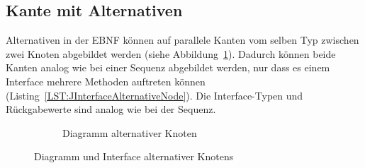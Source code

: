 \documentclass[../InterneDSLs.tex]{subfiles}
\begin{document}
\subsection{Kante mit Alternativen}
Alternativen in der EBNF können auf parallele Kanten vom selben Typ zwischen zwei Knoten abgebildet werden (siehe Abbildung~\ref{FIG:DiagramAlternativeNode}). Dadurch können beide Kanten analog wie bei einer Sequenz abgebildet werden, nur dass es einem Interface mehrere Methoden auftreten können (Listing~\ref{LST:JInterfaceAlternativeNode}). Die Interface-Typen und Rückgabewerte sind analog wie bei der Sequenz.
\begin{figure}[ht]
\centering
  \begin{subfigure}[c]{0.49\textwidth}
    \caption{Diagramm alternativer Knoten}
    \label{FIG:DiagramAlternativeNode}
  \end{subfigure}
  \begin{subfigure}[c]{0.49\textwidth}
    
  \end{subfigure}
  \caption{Diagramm und Interface alternativer Knotens}
  \label{FIG:AlternativeNode}
\end{figure}
\end{document}
